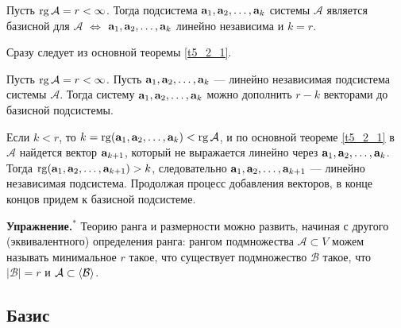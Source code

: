 

\begin{theor}\label{t7_2_2}
Пусть $\mathop{\rm rg}\nolimits \mathcal{A} = r<\infty $. Тогда подсистема $\mathbf{a}_1, \mathbf{a}_2, \ldots , \mathbf{a}_k$ системы $\mathcal{A}$ является базисной для $\mathcal{A}$
$\Leftrightarrow$ $\mathbf{a}_1, \mathbf{a}_2, \ldots , \mathbf{a}_k$ линейно независима и  $k=r$.
\end{theor}
\dok Сразу следует из основной теоремы \ref{t5_2_1}.
\edok

\begin{predl}\label{p7_2_6}
Пусть $\mathop{\rm rg}\nolimits \mathcal{A} = r<\infty $. Пусть $\mathbf{a}_1, \mathbf{a}_2, \ldots , \mathbf{a}_k$ --- линейно независимая подсистема 
системы $\mathcal{A}$. 
Тогда систему $\mathbf{a}_1, \mathbf{a}_2, \ldots , \mathbf{a}_k$ можно дополнить $r-k$ векторами до
базисной подсистемы. 
\end{predl}
\dok
Если $k<r$, то $k= \mathop{\rm rg}\nolimits (\mathbf{a}_1, \mathbf{a}_2, \ldots , \mathbf{a}_k ) < \mathop{\rm rg}\nolimits \mathcal{A}$,
и по основной теореме \ref{t5_2_1} в $\mathcal{A}$ найдется вектор $\mathbf{a}_{k+1}$,
который не выражается линейно через $\mathbf{a}_1, \mathbf{a}_2, \ldots , \mathbf{a}_k$.
Тогда $\mathop{\rm rg}\nolimits (\mathbf{a}_1, \mathbf{a}_2, \ldots , \mathbf{a}_{k+1} ) > k$, следовательно %
$\mathbf{a}_1, \mathbf{a}_2, \ldots , \mathbf{a}_{k+1}$ --- линейно независимая подсистема.
Продолжая процесс добавления векторов, в конце концов придем к базисной подсистеме.
\edok

\otstup

{\bf Упражнение.}$^*$ Теорию ранга и размерности можно развить, начиная с другого (эквивалентного)
определения ранга: рангом подмножества $\mathcal{A}\subset V$ можем называть 
минимальное $r$ такое, что существует подмножество $\mathcal{B}$ такое, что $|\mathcal{B}|=r$ 
и $\mathcal{A} \subset \langle \mathcal{B} \rangle$.

\subsection{Базис}

